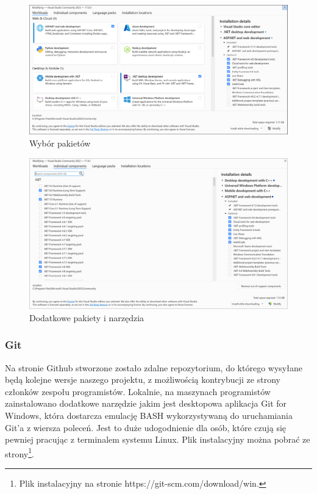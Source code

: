 \begin{figure}[!htb]
	\centering
	\includegraphics[width=0.8\linewidth]{rys/vs2.png}
	\caption{Wybór pakietów}
	\label{rys:rysunek002b}
\end{figure}

\begin{figure}[!htb]
	\centering
	\includegraphics[width=0.8\linewidth]{rys/vs3.png}
	\caption{Dodatkowe pakiety i narzędzia}
	\label{rys:rysunek002c}
\end{figure}

\subsubsection{Git} %

\hspace{0.60cm}Na stronie Github stworzone zostało zdalne repozytorium, do którego wysyłane będą kolejne wersje naszego projektu, z możliwością kontrybucji ze strony członków zespołu programistów. Lokalnie, na maszynach programistów zainstalowano dodatkowe narzędzie jakim jest desktopowa aplikacja Git for Windows, która dostarcza emulację BASH wykorzystywaną do uruchamiania Git'a z wiersza poleceń. Jest to duże udogodnienie dla osób, które czują się pewniej pracując z terminalem systemu Linux. Plik instalacyjny można pobrać ze strony\footnote{Plik instalacyjny na stronie https://git-scm.com/download/win\cite{www4}.}.

